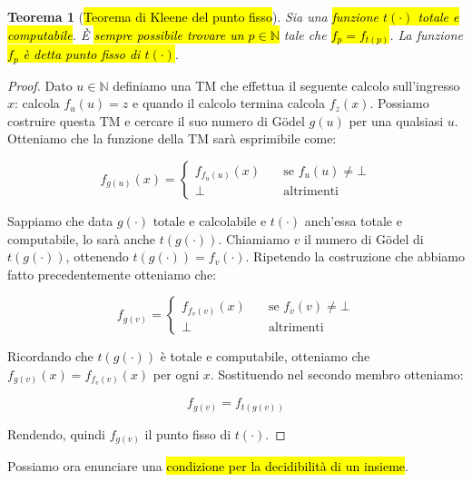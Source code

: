 \documentclass[a4paper,11pt,oneside]{article}
\theoremstyle{plain}
\newtheorem{thm}{Teorema}[section]
\theoremstyle{definition}
\theoremstyle{remark}
\begin{document}
\begin{thm}[\hl{Teorema di Kleene del punto fisso}]\label{thm:kleene-punto-fisso}
  Sia una \hl{funzione $t(\cdot)$ totale e computabile}. È \hl{sempre possibile
  trovare un $p \in \mathbb{N}$} tale che \hl{$f_p = f_{t(p)}$}. La funzione
  \hl{$f_p$ è detta punto fisso di $t(\cdot)$}.
\end{thm}
\begin{proof}
  Dato $u \in \mathbb{N}$ definiamo una TM che effettua il seguente calcolo
  sull'ingresso $x$: calcola $f_u(u) = z$ e quando il calcolo termina calcola
  $f_z(x)$. Possiamo costruire questa TM e cercare il suo numero di Gödel $g(u)$
  per una qualsiasi $u$. Otteniamo che la funzione della TM sarà esprimibile
  come:

  \[
    f_{g(u)}(x) =
    \begin{cases}
      f_{f_u(u)}(x) & \quad \text{se } f_u(u) \neq \bot \\
      \bot          & \quad \text{altrimenti}
    \end{cases}
  \]

  Sappiamo che data $g(\cdot)$ totale e calcolabile e $t(\cdot)$ anch'essa
  totale e computabile, lo sarà anche $t(g(\cdot))$. Chiamiamo $v$ il numero di
  Gödel di $t(g(\cdot))$, ottenendo $t(g(\cdot)) = f_v(\cdot)$. Ripetendo la
  costruzione che abbiamo fatto precedentemente otteniamo che:

  \[
    f_{g(v)} =
    \begin{cases}
      f_{f_v(v)}(x) & \quad \text{se } f_v(v) \neq \bot \\
      \bot          & \quad \text{altrimenti}
    \end{cases}
  \]

  Ricordando che $t(g(\cdot))$ è totale e computabile, otteniamo che
  $f_{g(v)}(x) = f_{f_v(v)}(x)$ per ogni $x$. Sostituendo nel secondo membro
  otteniamo:

  \[
    f_{g(v)} = f_{t(g(v))}
  \]

  Rendendo, quindi $f_{g(v)}$ il punto fisso di $t(\cdot)$.
\end{proof}

Possiamo ora enunciare una \hl{condizione per la decidibilità di un insieme}.
\end{document}
